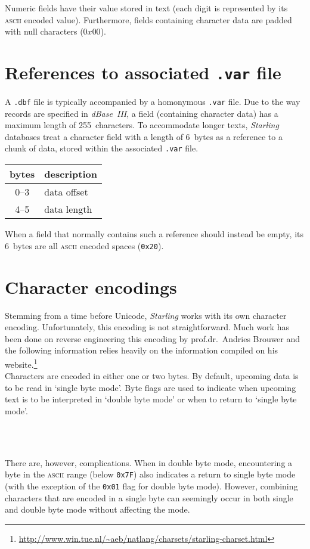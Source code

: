 \documentclass[12pt]{article}
\newcommand{\thead}[1]{\multicolumn{1}{c}{\textbf{#1}}}
\newcommand{\dBaseIII}{\mbox{\emph{dBase~III}}}
\newcommand{\Starling}{\emph{Starling}}
\newcommand{\fileext}[1]{\mbox{\texttt{.#1}}}
\newcommand{\ASCII}{\textsc{ascii}}
\newcommand{\Brouwer}{prof.dr.~Andries Brouwer}
\newcommand{\byte}[1]{\texttt{#1}}
\begin{document}
Numeric fields have their value stored in text (each digit is represented by its \ASCII{} encoded value).
Furthermore, fields containing character data are padded with null characters ($0x00$).

\section{References to associated \fileext{var} file}\label{sec:var}
A \fileext{dbf} file is typically accompanied by a homonymous \fileext{var} file. Due to the way records are specified in \dBaseIII{}, a field (containing character data) has a maximum length of 255~characters. To accommodate longer texts, \Starling{} databases treat a character field with a length of 6~bytes as a reference to a chunk of data, stored within the associated \fileext{var} file.
\begin{center}
	\begin{tabular}{cl}
	\toprule
	\thead{bytes} & \thead{description}\\
	\midrule
		0--3 & data offset\\
		4--5 & data length\\
	\bottomrule
	\end{tabular}
\end{center}
When a field that normally contains such a reference should instead be empty, its 6~bytes are all \ASCII{} encoded spaces (\byte{0x20}).

\section{Character encodings}\label{sec:encoding}

Stemming from a time before Unicode, \Starling{} works with its own character encoding. Unfortunately, this encoding is not straightforward. Much work has been done on reverse engineering this encoding by \Brouwer{} and the following information relies heavily on the information compiled on his website.\footnote{\url{http://www.win.tue.nl/~aeb/natlang/charsets/starling-charset.html}}\\

Characters are encoded in either one or two bytes. By default, upcoming data is to be read in `single byte mode'. Byte flags are used to indicate when upcoming text is to be interpreted in `double byte mode' or when to return to `single byte mode'.
\begin{center}
	\begin{values}
		\toprule
		\\
		\\
		\bottomrule
	\end{values}
\end{center}
There are, however, complications. When in double byte mode, encountering a byte in the \ASCII{} range (below \byte{0x7F}) also indicates a return to single byte mode (with the exception of the \byte{0x01} flag for double byte mode). However, combining characters that are encoded in a single byte can seemingly occur in both single and double byte mode without affecting the mode.
\end{document}
